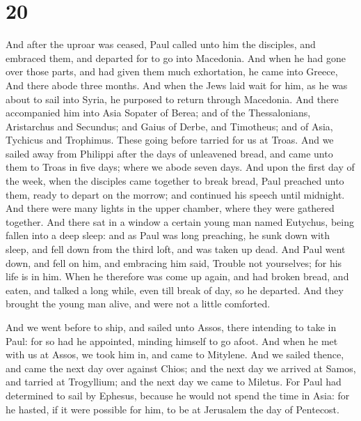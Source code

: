 \hypertarget{section-19}{%
\section{20}\label{section-19}}

 And after the uproar was ceased, Paul called unto him the
disciples, and embraced them, and departed for to go into Macedonia.
 And when he had gone over those parts, and had given them
much exhortation, he came into Greece,  And there abode
three months. And when the Jews laid wait for him, as he was about to
sail into Syria, he purposed to return through Macedonia. 
And there accompanied him into Asia Sopater of Berea; and of the
Thessalonians, Aristarchus and Secundus; and Gaius of Derbe, and
Timotheus; and of Asia, Tychicus and Trophimus.  These going
before tarried for us at Troas.  And we sailed away from
Philippi after the days of unleavened bread, and came unto them to Troas
in five days; where we abode seven days.  And upon the first
day of the week, when the disciples came together to break bread, Paul
preached unto them, ready to depart on the morrow; and continued his
speech until midnight.  And there were many lights in the
upper chamber, where they were gathered together.  And there
sat in a window a certain young man named Eutychus, being fallen into a
deep sleep: and as Paul was long preaching, he sunk down with sleep, and
fell down from the third loft, and was taken up dead.  And
Paul went down, and fell on him, and embracing him said, Trouble not
yourselves; for his life is in him.  When he therefore was
come up again, and had broken bread, and eaten, and talked a long while,
even till break of day, so he departed.  And they brought
the young man alive, and were not a little comforted.

 And we went before to ship, and sailed unto Assos, there
intending to take in Paul: for so had he appointed, minding himself to
go afoot.  And when he met with us at Assos, we took him
in, and came to Mitylene.  And we sailed thence, and came
the next day over against Chios; and the next day we arrived at Samos,
and tarried at Trogyllium; and the next day we came to Miletus.
 For Paul had determined to sail by Ephesus, because he
would not spend the time in Asia: for he hasted, if it were possible for
him, to be at Jerusalem the day of Pentecost.


